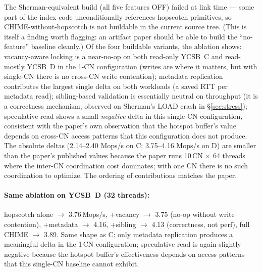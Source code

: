 \documentclass[11pt,a4paper]{article}
\begin{document}
The Sherman-equivalent build (all five features OFF) failed at link time --- some part of the index code unconditionally references hopscotch primitives, so CHIME-without-hopscotch is not buildable in the current source tree. (This is itself a finding worth flagging: an artifact paper should be able to build the ``no-feature'' baseline cleanly.) Of the four buildable variants, the ablation shows: vacancy-aware locking is a near-no-op on both read-only YCSB~C and read-mostly YCSB~D in the 1-CN configuration (writes are where it matters, but with single-CN there is no cross-CN write contention); metadata replication contributes the largest single delta on both workloads (a saved RTT per metadata read); sibling-based validation is essentially neutral on throughput (it is a correctness mechanism, observed on Sherman's LOAD crash in §\ref{sec:stress}); speculative read shows a small \emph{negative} delta in this single-CN configuration, consistent with the paper's own observation that the hotspot buffer's value depends on cross-CN access patterns that this configuration does not produce. The absolute deltas (2.14--2.40 Mops/s on C; 3.75--4.16 Mops/s on D) are smaller than the paper's published values because the paper runs 10\,CN $\times$ 64 threads where the inter-CN coordination cost dominates; with one CN there is no such coordination to optimize. The ordering of contributions matches the paper.

\paragraph{Same ablation on YCSB~D (32 threads):} hopscotch alone $\to$ 3.76\,Mops/s, +vacancy $\to$ 3.75 (no-op without write contention), +metadata $\to$ 4.16, +sibling $\to$ 4.13 (correctness, not perf), full CHIME $\to$ 3.89. Same shape as C: only metadata replication produces a meaningful delta in the 1\,CN configuration; speculative read is again slightly negative because the hotspot buffer's effectiveness depends on access patterns that this single-CN baseline cannot exhibit.
\end{document}
